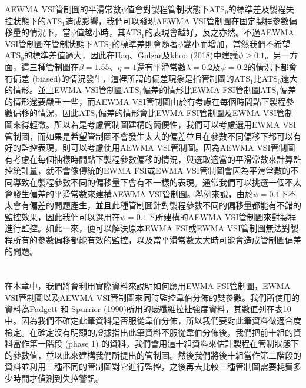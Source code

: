 \documentclass[12pt]{article}  %
\theoremstyle{plain}
\begin{document}
AEWMA VSI管制圖的平滑常數$\psi$值會對製程管制狀態下ATS$_0$的標準差及製程失控狀態下的ATS$_1$造成影響，我們可以發現AEWMA VSI管制圖在固定製程參數偏移量的情況下，當$\psi$值越小時，其ATS$_1$的表現會越好，反之亦然。不過AEWMA VSI管制圖在管制狀態下ATS$_0$的標準差則會隨著$\psi$變小而增加，當然我們不希望ATS$_0$的標準差值過大，因此在Haq、Gulzar及khoo (2018)中建議$\psi \geq 0.1$。另一方面，這三種管制圖在$\beta=1.55$、$\eta=1$還有平滑常數$\lambda=0.2$及$\psi=0.2$的情況下都會有偏差 (biased)的情況發生，這裡所謂的偏差現象是指管制圖的ATS$_1$比ATS$_0$還大的情形。並且EWMA VSI管制圖ATS$_1$偏差的情形比EWMA FSI管制圖ATS$_1$偏差的情形還要嚴重一些，而AEWMA VSI管制圖由於有考慮在每個時間點下製程參數偏移的情況，因此ATS$_1$偏差的情形會比EWMA FSI管制圖及EWMA VSI管制圖來得輕微。所以若是考慮管制圖建構的簡便性，我們可以考慮選用EWMA VSI管制圖，而如果是希望管制圖不會發生太大的偏差並且在參數不同偏移下都可以有好的監控表現，則可以考慮使用AEWMA VSI管制圖。因為AEWMA VSI管制圖有考慮在每個抽樣時間點下製程參數偏移的情況，與選取適當的平滑常數來計算監控統計量，就不會像傳統的EWMA FSI或EWMA VSI管制圖會因為平滑常數的不同導致在製程參數不同的偏移量下會有不一樣的表現。通常我們可以挑選一個不太會發生偏差的平滑常數來建構AEWMA VSI管制圖。舉例來說，由於$\psi=0.1$下不太會有偏差的問題產生，並且此種管制圖針對製程參數不同的偏移量都能有不錯的監控效果，因此我們可以選用在$\psi=0.1$下所建構的AEWMA VSI管制圖來對製程進行監控。如此一來，便可以解決原本EWMA FSI或EWMA VSI管制圖無法對製程所有的參數偏移都能有效的監控，以及當平滑常數太大時可能會造成管制圖偏差的問題。


\newpage

\section{}
在本章中，我們將會利用實際資料來說明如何應用EWMA FSI管制圖，EWMA VSI管制圖以及AEWMA VSI管制圖來同時監控韋伯分佈的雙參數。我們所使用的資料為Padgett 和 Spurrier (1990)所用的碳纖維拉扯強度資料，其數值列在表10中。因為我們不確定此筆資料是否服從韋伯分佈，所以我們要對此筆資料做適合度檢定。在確定沒有明顯的證據指出此筆資料不服從韋伯分佈後，我們把前十組的資料當作第一階段 (phase 1) 的資料，我們會用這十組資料來估計製程在管制狀態下的參數值，並以此來建構我們所提出的管制圖。然後我們將後十組當作第二階段的資料並利用三種不同的管制圖對它進行監控，之後再去比較三種管制圖需要耗費多少時間才偵測到失控警訊。
\end{document}
